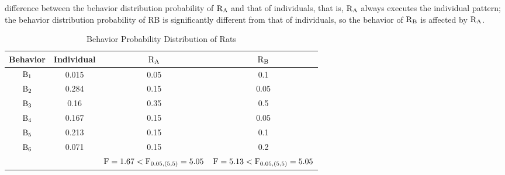 difference between the behavior distribution probability of $\rm R_A$ and that
of individuals, that is, $\rm R_A$ always executes the individual pattern; the
behavior distribution probability of RB is significantly different from that of
individuals, so the behavior of $\rm R_B$ is affected by $\rm R_A$.
\begin{table}[b]
    \caption{Behavior Probability Distribution of Rats}
    \centering
    \begin{tabular}{cccc}
            \hline
            Behavior & Individual & $\rm R_A$ & $\rm R_B$ \\
            \hline
            $\rm B_1$ & 0.015 & 0.05 & 0.1 \\
            $\rm B_2$ & 0.284 & 0.15 & 0.05 \\
            $\rm B_3$ & 0.16 & 0.35 & 0.5 \\
            $\rm B_4$ & 0.167 & 0.15 & 0.05 \\
            $\rm B_5$ & 0.213 & 0.15 & 0.1 \\
            $\rm B_6$ & 0.071 & 0.15 & 0.2 \\
             &  & ${\rm F}=1.67<{\rm F}_{0.05,(5,5)}=5.05$ & ${\rm F}=5.13<{\rm F}_{0.05,(5,5)}=5.05$ \\
            \hline
            \end{tabular}
    \label{table:Behavior Probability Distribution of Rats}
\end{table}
